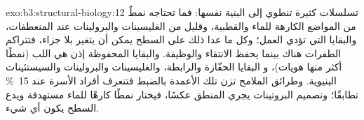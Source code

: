 \begin{solution}{exo:b3:structural-biology:12}
تسلسلات كثيرة تنطوي إلى البنية نفسها: فما تحتاجه 
نمطٌ من المواضع الكارهة للماء والقطبية، وقليل من الغليسينات والبرولينات
عند المنعطفات، والبقايا التي تؤدي العمل؛ وكل ما عدا ذلك على
السطح يمكن أن يتغير بلا جزاء، فتتراكم الطفرات هناك بينما
يحفظ الانتقاء  والوظيفة. والبقايا المحفوظة
إذن هي اللب (نمطًا أكثر منها هويات)، و
البقايا الحفّازة والرابطة، والغليسينات والبرولينات والسيستئينات
البنيوية. وطرائق الملامح تزن تلك الأعمدة بالضبط فتتعرف
أفراد الأسرة عند \qty{15}{\%} تطابقًا؛ وتصميم البروتينات يجري
المنطق عكسًا، فيختار نمطًا كارهًا للماء  مستهدفة
ويدع السطح يكون أي شيء.
\end{solution}

